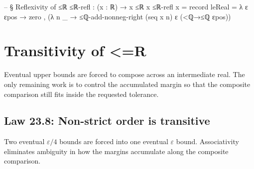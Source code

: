 \documentclass[11pt,a4paper]{book}
\def\mathbb#1{#1}%
\def\texorpdfstring#1#2{#2}%
\begin{document}
\begin{code}
-- § Reflexivity of ≤ℝ
≤ℝ-refl : (x : ℝ) → x ≤ℝ x
≤ℝ-refl x = record
  { leReal = λ ε εpos →
      zero , (λ n _ →
        ≤ℚ-add-nonneg-right (seq x n) ε (<ℚ→≤ℚ εpos))
  }
\end{code}


\section{Transitivity of \texorpdfstring{$\le_{\mathbb{R}}$}{<=R}}

Eventual upper bounds are forced to compose across an intermediate real. The only remaining work is to control the accumulated margin so that the composite comparison still fits inside the requested tolerance.

\subsection*{Law 23.8: Non-strict order is transitive}

Two eventual $\varepsilon/4$ bounds are forced into one eventual $\varepsilon$ bound. Associativity eliminates ambiguity in how the margins accumulate along the composite comparison.
\end{document}

